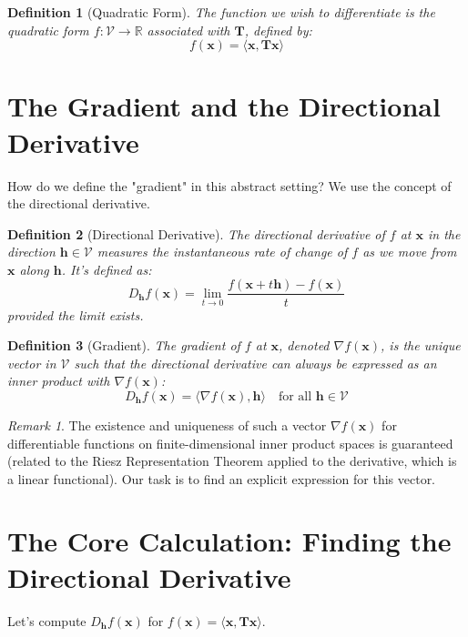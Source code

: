 \documentclass[11pt]{article}
\theoremstyle{mydefinitionstyle}
\newtheorem{definition}{Definition}[section]
\theoremstyle{mytheoremstyle}
\theoremstyle{remark}
\newtheorem{remark}{Remark}[section]
\newcommand{\R}{\mathbb{R}}
\newcommand{\V}{\mathcal{V}} %
\newcommand{\T}{\mathbf{T}} %
\newcommand{\x}{\mathbf{x}} %
\newcommand{\h}{\mathbf{h}} %
\newcommand{\grad}{\nabla} %
\newcommand{\inner}[2]{\langle #1, #2 \rangle} %
\begin{document}
\begin{definition}[Quadratic Form]
    The function we wish to differentiate is the quadratic form $f: \V \to \R$ associated with $\T$, defined by:
    \[ f(\x) = \inner{\x}{\T\x} \]
\end{definition}

\section{The Gradient and the Directional Derivative}

How do we define the "gradient" in this abstract setting? We use the concept of the directional derivative.

\begin{definition}[Directional Derivative]
    The directional derivative of $f$ at $\x$ in the direction $\h \in \V$ measures the instantaneous rate of change of $f$ as we move from $\x$ along $\h$. It's defined as:
    \[ D_{\h}f(\x) = \lim_{t \to 0} \frac{f(\x + t\h) - f(\x)}{t} \]
    provided the limit exists.
\end{definition}

\begin{definition}[Gradient]
    The gradient of $f$ at $\x$, denoted $\grad f(\x)$, is the \emph{unique} vector in $\V$ such that the directional derivative can always be expressed as an inner product with $\grad f(\x)$:
    \[ D_{\h}f(\x) = \inner{\grad f(\x)}{\h} \quad \text{for all } \h \in \V \]
\end{definition}
\begin{remark}
    The existence and uniqueness of such a vector $\grad f(\x)$ for differentiable functions on finite-dimensional inner product spaces is guaranteed (related to the Riesz Representation Theorem applied to the derivative, which is a linear functional). Our task is to find an explicit expression for this vector.
\end{remark}

\section{The Core Calculation: Finding the Directional Derivative}

Let's compute $D_{\h}f(\x)$ for $f(\x) = \inner{\x}{\T\x}$.
\end{document}
